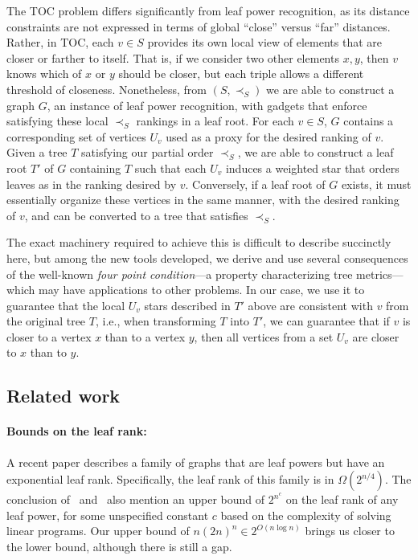 \documentclass[11pt, letter]{article}
\theoremstyle{remark}
\begin{document}
The TOC problem differs significantly from leaf power recognition, as its distance constraints are not expressed in terms of global ``close'' versus ``far'' distances.  Rather, in TOC, each $v \in S$ provides its own local view of elements that are closer or farther to itself.  That is, if we consider two other elements $x, y$, then $v$ knows which of $x$ or $y$ should be closer, but each triple allows a different threshold of closeness.  
Nonetheless, from $(S, \prec_S)$ we are able to construct a graph $G$, an instance of leaf power recognition, with gadgets that enforce 
satisfying these local $\prec_S$ rankings in a leaf root.  For each $v \in S$, $G$ contains a corresponding set of vertices $U_v$ used as a proxy for the desired ranking of $v$.  Given a tree $T$ satisfying our partial order $\prec_S$, we are able to construct a leaf root $T'$ of $G$ containing $T$ 
such that each $U_v$ induces a weighted star that orders leaves as in the ranking desired by $v$.  Conversely, if a leaf root of $G$ exists, it must essentially organize these vertices in the same manner, with the desired ranking of $v$, and can be converted to a tree that satisfies $\prec_S$.

The exact machinery required to achieve this is difficult to describe succinctly here, but among the new tools developed,  we derive and use several consequences of the well-known \emph{four point condition}—a property characterizing tree metrics—which may have applications to other problems.  
In our case, we use it to guarantee that the local $U_v$ stars described in $T'$ above are consistent with $v$ from the original tree $T$, i.e., when transforming $T$ into $T'$, 
we can guarantee that if $v$ is closer to a vertex $x$ than to a vertex $y$, then all vertices from a set $U_v$ are closer to $x$ than to $y$.






\subsection{Related work}

\paragraph{Bounds on the leaf rank:} A recent paper \cite{LowerBoundLR} describes a family of graphs that are leaf powers but have an exponential leaf rank. Specifically, the leaf rank of this family is in $\Omega(2^{n/4})$. 
The conclusion of~\cite{LowerBoundLR} and~\cite[Chapter 11]{hogemo2025mapping} also mention an upper bound of $2^{n^c}$ on the leaf rank of any leaf power, for some unspecified constant $c$ based on the complexity of solving linear programs.  Our upper bound of $n (2n)^n \in 2^{O(n \log n)}$ brings us closer to the lower bound, although there is still a gap.
\end{document}
